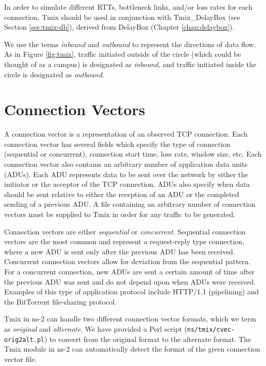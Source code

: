 In order to simulate different RTTs, bottleneck links, and/or loss
rates for each connection, Tmix should be used in conjunction with
Tmix\_DelayBox (see Section \ref{sec:tmix-db}), derived from
DelayBox (Chapter \ref{chap:delaybox}).  

We use the terms \emph{inbound} and \emph{outbound} to represent the
directions of data flow.  As in Figure \ref{fig:tmix}, traffic
initiated outside of the circle (which could be thought of as a
campus) is designated as \emph{inbound}, and traffic initiated inside
the circle is designated as \emph{outbound}.

\section{Connection Vectors}

A connection vector is a representation of an observed TCP connection.
Each connection vector has several fields which specify the type of
connection (sequential or concurrent), connection start time, loss
rate, window size, etc.  Each connection vector also contains an
arbitrary number of application data units (ADUs).  Each ADU represents
data to be sent over the network by either the initiator or the
acceptor of the TCP connection.  ADUs also specify when data should be
sent relative to either the reception of an ADU or the completed
sending of a previous ADU.  A file containing an arbitrary number of
connection vectors must be supplied to Tmix in order for any traffic
to be generated.  

Connection vectors are either \emph{sequential} or \emph{concurrent}.
Sequential connection vectors are the most common and represent a
request-reply type connection, where a new ADU is sent only after the
previous ADU has been received.  Concurrent connection vectors allow
for deviation from the sequential pattern.  For a concurrent
connection, new ADUs are sent a certain amount of time after the
previous ADU was sent and do not depend upon when ADUs were
received. Examples of this type of application protocol include
HTTP/1.1 (pipelining) and the BitTorrent file-sharing protocol.

Tmix in ns-2 can handle two different connection vector formats, which
we term as \emph{original} and \emph{alternate}.  We have provided a Perl
script ({\tt ns/tmix/cvec-orig2alt.pl}) to convert from the original format to
the alternate format.  The Tmix module in ns-2 can automatically
detect the format of the given connection vector file.

